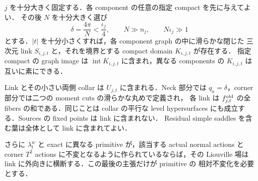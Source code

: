 \begin{lemma}
\label{ke:closed-component-link}
$j$ を十分大きく固定する．各 component の任意の指定 compact を先に与えてよい．
その後 $N$ を十分大きく選び
\[
 \delta=\frac{4\pi}{N}<\frac{\iota_j}{4},\qquad
 N\gg n_j,\qquad N\iota_j\gg1
\]
とする．$|t|$ を十分小さくすれば，各 component graph の中に滑らかな閉じた
三次元 link $S_{i,j,t}$ と，それを境界とする compact domain $K_{i,j,t}$ が存在する．
指定 compact の graph image は $\operatorname{int}K_{i,j,t}$ に含まれ，異なる
components の $K_{i,j,t}$ は互いに素にできる．

Link とその小さい両側 collar は $U_{j,t}$ に含まれる．Neck 部分では
$q_a=\delta$，corner 部分では二つの moment cuts の滑らかな丸めで定義され，
各 link は $f^{\rm old}_{j,t}$ の全 fibers の和である．同じことは collar の平行な
level hypersurfaces にも成立する．Sources の fixed points は link に含まれない．
Residual simple saddles を含む葉は全体として link に含まれてよい．

さらに $\lambda_t^w$ と exact に異なる primitive が，該当する actual normal
actions と corner $T^2$ actions に不変となるように作られているならば，その
Liouville 場は link に外向きに横断する．この最後の主張だけが primitive の
相対不変化を必要とする．
\end{lemma}

